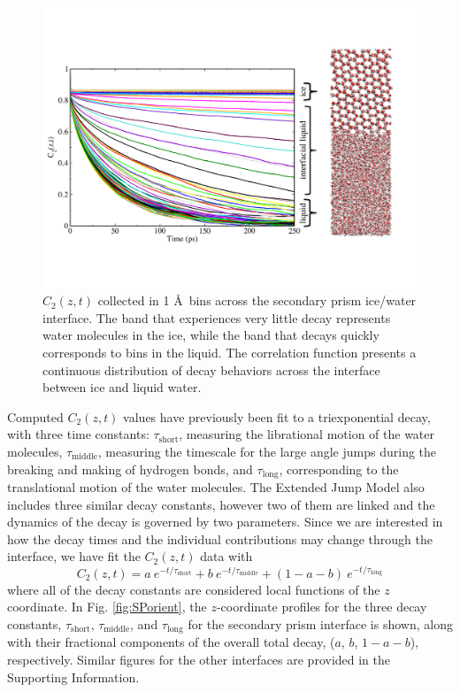 \documentclass[journal = jpccck, manuscript = article]{achemso}
\begin{document}
\begin{figure}
\includegraphics[width=\linewidth]{CztImage}
\caption{\label{fig:Czt} $C_2(z,t)$ collected in 1 \AA~bins across the
  secondary prism ice/water interface. The band that experiences very
  little decay represents water molecules in the ice, while the band
  that decays quickly corresponds to bins in the liquid.  The
  correlation function presents a continuous distribution of decay
  behaviors across the interface between ice and liquid water.}
\end{figure}

Computed $C_2(z,t)$ values have previously been fit to a
triexponential decay, with three time constants:
$\tau_\mathrm{short}$, measuring the librational motion of the water
molecules, $\tau_\mathrm{middle}$, measuring the timescale for the
large angle jumps during the breaking and making of hydrogen bonds,
and $\tau_\mathrm{long}$, corresponding to the translational motion of
the water molecules.\cite{Louden2013} The Extended Jump Model also
includes three similar decay constants, however two of them are linked
and the dynamics of the decay is governed by two parameters. Since we
are interested in how the decay times and the individual contributions
may change through the interface, we have fit the $C_2(z,t)$ data
with
\begin{equation}
  C_{2}(z,t) = a~e^{-t/\tau_\mathrm{short}} + b~e^{-t/\tau_\mathrm{middle}} + 
  (1-a-b)~e^{-t/\tau_\mathrm{long}}
\label{eq:c2}
\end{equation}
where all of the decay constants are considered local functions of the
$z$ coordinate. In Fig. \ref{fig:SPorient}, the $z$-coordinate
profiles for the three decay constants, $\tau_{\mathrm{short}}$,
$\tau_{\mathrm{middle}}$, and $\tau_{\mathrm{long}}$ for the secondary prism interface
is shown, along with their fractional components of the overall total
decay, ($a$, $b$, $1-a-b$), respectively. Similar figures for the
other interfaces are provided in the Supporting Information.
\end{document}
